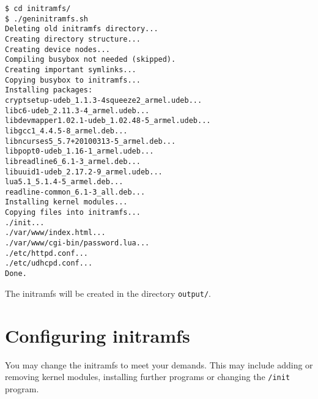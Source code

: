 \texttt{\$ cd initramfs/} \\
\texttt{\$ ./geninitramfs.sh} \\
\texttt{Deleting old initramfs directory... } \\
\texttt{Creating directory structure... } \\
\texttt{Creating device nodes... } \\
\texttt{Compiling busybox not needed (skipped). } \\
\texttt{Creating important symlinks... } \\
\texttt{Copying busybox to initramfs... } \\
\texttt{Installing packages: } \\
\texttt{cryptsetup-udeb\_1.1.3-4squeeze2\_armel.udeb... } \\
\texttt{libc6-udeb\_2.11.3-4\_armel.udeb... } \\
\texttt{libdevmapper1.02.1-udeb\_1.02.48-5\_armel.udeb... } \\
\texttt{libgcc1\_4.4.5-8\_armel.deb... } \\
\texttt{libncurses5\_5.7+20100313-5\_armel.deb... } \\
\texttt{libpopt0-udeb\_1.16-1\_armel.udeb... } \\
\texttt{libreadline6\_6.1-3\_armel.deb... } \\
\texttt{libuuid1-udeb\_2.17.2-9\_armel.udeb... } \\
\texttt{lua5.1\_5.1.4-5\_armel.deb... } \\
\texttt{readline-common\_6.1-3\_all.deb... } \\
\texttt{Installing kernel modules... } \\
\texttt{Copying files into initramfs... } \\
\texttt{./init... } \\
\texttt{./var/www/index.html... } \\
\texttt{./var/www/cgi-bin/password.lua... } \\
\texttt{./etc/httpd.conf... } \\
\texttt{./etc/udhcpd.conf... } \\
\texttt{Done.}

The initramfs will be created in the directory \texttt{output/}.

\section{Configuring initramfs}

You may change the initramfs to meet your demands. This may include adding or
removing kernel modules, installing further programs or changing the
\texttt{/init} program.

